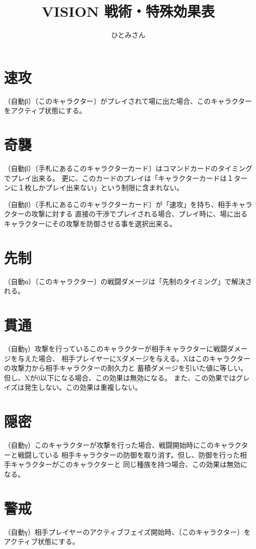 \documentclass[fontsize=9pt,twocolumn,hanging_punctuation]{jlreq}
\title{VISION 戦術・特殊効果表}
\author{ひとみさん}
\date{\warekitoday}
\begin{document}
\maketitle

\section*{速攻}
（自動β）〔このキャラクター〕がプレイされて場に出た場合、このキャラクターをアクティブ状態にする。

\section*{奇襲}
（自動β）〔手札にあるこのキャラクターカード〕はコマンドカードのタイミングでプレイ出来る。
更に、このカードのプレイは「キャラクターカードは１ターンに１枚しかプレイ出来ない」という制限に含まれない。

（自動β）〔手札にあるこのキャラクターカード〕が「速攻」を持ち、相手キャラクターの攻撃に対する
直接の干渉でプレイされる場合、プレイ時に、場に出るキャラクターにその攻撃を防御させる事を選択出来る。

\section*{先制}
（自動α）〔このキャラクター〕の戦闘ダメージは「先制のタイミング」で解決される。

\section*{貫通}
（自動γ）攻撃を行っているこのキャラクターが相手キャラクターに戦闘ダメージを与えた場合、
相手プレイヤーにXダメージを与える。Xはこのキャラクターの攻撃力から相手キャラクターの耐久力と
蓄積ダメージを引いた値に等しい。但し、Xが0以下になる場合、この効果は無効になる。
また、この効果ではグレイズは発生しない。この効果は重複しない。

\section*{隠密}
（自動γ）このキャラクターが攻撃を行った場合、戦闘開始時にこのキャラクターと戦闘している
相手キャラクターの防御を取り消す。但し、防御を行った相手キャラクターがこのキャラクターと
同じ種族を持つ場合、この効果は無効になる。

\pagebreak
\section*{警戒}
（自動γ）相手プレイヤーのアクティブフェイズ開始時、〔このキャラクター〕をアクティブ状態にする。
\end{document}
